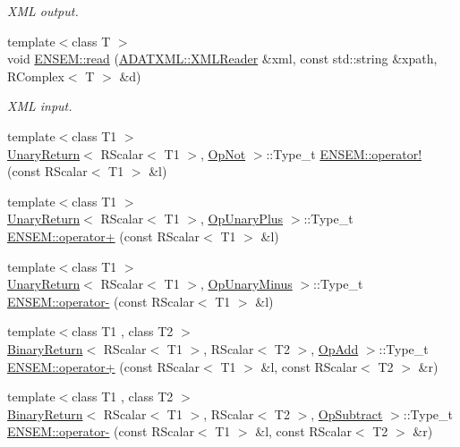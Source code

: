 \begin{DoxyCompactItemize}
\begin{DoxyCompactList}\small\item\em X\+ML output. \end{DoxyCompactList}\item 
{\footnotesize template$<$class T $>$ }\\void \mbox{\hyperlink{group__rcomplex_ga4e957daaafbfd0e1b97883627dddd8f7}{E\+N\+S\+E\+M\+::read}} (\mbox{\hyperlink{classADATXML_1_1XMLReader}{A\+D\+A\+T\+X\+M\+L\+::\+X\+M\+L\+Reader}} \&xml, const std\+::string \&xpath, R\+Complex$<$ T $>$ \&d)
\begin{DoxyCompactList}\small\item\em X\+ML input. \end{DoxyCompactList}\item 
{\footnotesize template$<$class T1 $>$ }\\\mbox{\hyperlink{structUnaryReturn}{Unary\+Return}}$<$ R\+Scalar$<$ T1 $>$, \mbox{\hyperlink{structOpNot}{Op\+Not}} $>$\+::Type\+\_\+t \mbox{\hyperlink{group__rscalar_gaf7f4b83a6f16cb689121bc04a4c6f0e2}{E\+N\+S\+E\+M\+::operator!}} (const R\+Scalar$<$ T1 $>$ \&l)
\item 
{\footnotesize template$<$class T1 $>$ }\\\mbox{\hyperlink{structUnaryReturn}{Unary\+Return}}$<$ R\+Scalar$<$ T1 $>$, \mbox{\hyperlink{structOpUnaryPlus}{Op\+Unary\+Plus}} $>$\+::Type\+\_\+t \mbox{\hyperlink{group__rscalar_ga2ad5c813070059a7a12cee82d5e2bbae}{E\+N\+S\+E\+M\+::operator+}} (const R\+Scalar$<$ T1 $>$ \&l)
\item 
{\footnotesize template$<$class T1 $>$ }\\\mbox{\hyperlink{structUnaryReturn}{Unary\+Return}}$<$ R\+Scalar$<$ T1 $>$, \mbox{\hyperlink{structOpUnaryMinus}{Op\+Unary\+Minus}} $>$\+::Type\+\_\+t \mbox{\hyperlink{group__rscalar_ga2543f899f104b7784d528fadce2253e0}{E\+N\+S\+E\+M\+::operator-\/}} (const R\+Scalar$<$ T1 $>$ \&l)
\item 
{\footnotesize template$<$class T1 , class T2 $>$ }\\\mbox{\hyperlink{structBinaryReturn}{Binary\+Return}}$<$ R\+Scalar$<$ T1 $>$, R\+Scalar$<$ T2 $>$, \mbox{\hyperlink{structOpAdd}{Op\+Add}} $>$\+::Type\+\_\+t \mbox{\hyperlink{group__rscalar_gac30d53b8acaa797f936d2b74a1fbf592}{E\+N\+S\+E\+M\+::operator+}} (const R\+Scalar$<$ T1 $>$ \&l, const R\+Scalar$<$ T2 $>$ \&r)
\item 
{\footnotesize template$<$class T1 , class T2 $>$ }\\\mbox{\hyperlink{structBinaryReturn}{Binary\+Return}}$<$ R\+Scalar$<$ T1 $>$, R\+Scalar$<$ T2 $>$, \mbox{\hyperlink{structOpSubtract}{Op\+Subtract}} $>$\+::Type\+\_\+t \mbox{\hyperlink{group__rscalar_ga22496c110ec4476e821ba39707b72b6f}{E\+N\+S\+E\+M\+::operator-\/}} (const R\+Scalar$<$ T1 $>$ \&l, const R\+Scalar$<$ T2 $>$ \&r)

\end{DoxyCompactItemize}
